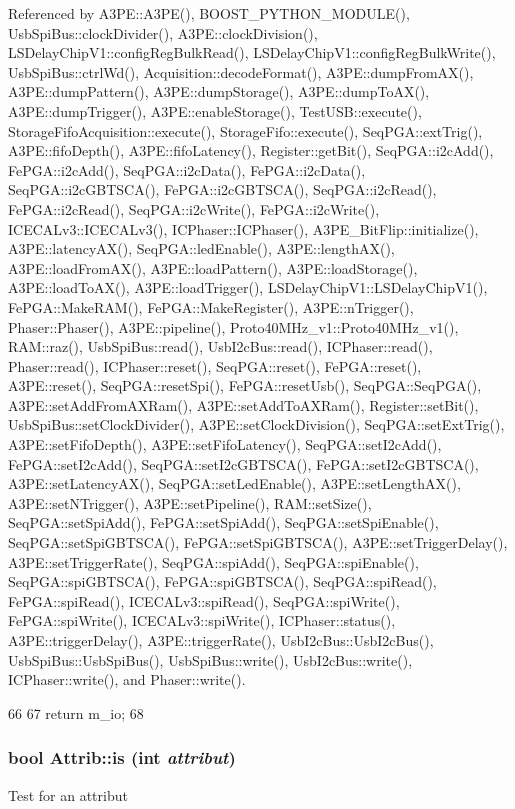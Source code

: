 Referenced by A3PE::A3PE(), BOOST\_\-PYTHON\_\-MODULE(), UsbSpiBus::clockDivider(), A3PE::clockDivision(), LSDelayChipV1::configRegBulkRead(), LSDelayChipV1::configRegBulkWrite(), UsbSpiBus::ctrlWd(), Acquisition::decodeFormat(), A3PE::dumpFromAX(), A3PE::dumpPattern(), A3PE::dumpStorage(), A3PE::dumpToAX(), A3PE::dumpTrigger(), A3PE::enableStorage(), TestUSB::execute(), StorageFifoAcquisition::execute(), StorageFifo::execute(), SeqPGA::extTrig(), A3PE::fifoDepth(), A3PE::fifoLatency(), Register::getBit(), SeqPGA::i2cAdd(), FePGA::i2cAdd(), SeqPGA::i2cData(), FePGA::i2cData(), SeqPGA::i2cGBTSCA(), FePGA::i2cGBTSCA(), SeqPGA::i2cRead(), FePGA::i2cRead(), SeqPGA::i2cWrite(), FePGA::i2cWrite(), ICECALv3::ICECALv3(), ICPhaser::ICPhaser(), A3PE\_\-BitFlip::initialize(), A3PE::latencyAX(), SeqPGA::ledEnable(), A3PE::lengthAX(), A3PE::loadFromAX(), A3PE::loadPattern(), A3PE::loadStorage(), A3PE::loadToAX(), A3PE::loadTrigger(), LSDelayChipV1::LSDelayChipV1(), FePGA::MakeRAM(), FePGA::MakeRegister(), A3PE::nTrigger(), Phaser::Phaser(), A3PE::pipeline(), Proto40MHz\_\-v1::Proto40MHz\_\-v1(), RAM::raz(), UsbSpiBus::read(), UsbI2cBus::read(), ICPhaser::read(), Phaser::read(), ICPhaser::reset(), SeqPGA::reset(), FePGA::reset(), A3PE::reset(), SeqPGA::resetSpi(), FePGA::resetUsb(), SeqPGA::SeqPGA(), A3PE::setAddFromAXRam(), A3PE::setAddToAXRam(), Register::setBit(), UsbSpiBus::setClockDivider(), A3PE::setClockDivision(), SeqPGA::setExtTrig(), A3PE::setFifoDepth(), A3PE::setFifoLatency(), SeqPGA::setI2cAdd(), FePGA::setI2cAdd(), SeqPGA::setI2cGBTSCA(), FePGA::setI2cGBTSCA(), A3PE::setLatencyAX(), SeqPGA::setLedEnable(), A3PE::setLengthAX(), A3PE::setNTrigger(), A3PE::setPipeline(), RAM::setSize(), SeqPGA::setSpiAdd(), FePGA::setSpiAdd(), SeqPGA::setSpiEnable(), SeqPGA::setSpiGBTSCA(), FePGA::setSpiGBTSCA(), A3PE::setTriggerDelay(), A3PE::setTriggerRate(), SeqPGA::spiAdd(), SeqPGA::spiEnable(), SeqPGA::spiGBTSCA(), FePGA::spiGBTSCA(), SeqPGA::spiRead(), FePGA::spiRead(), ICECALv3::spiRead(), SeqPGA::spiWrite(), FePGA::spiWrite(), ICECALv3::spiWrite(), ICPhaser::status(), A3PE::triggerDelay(), A3PE::triggerRate(), UsbI2cBus::UsbI2cBus(), UsbSpiBus::UsbSpiBus(), UsbSpiBus::write(), UsbI2cBus::write(), ICPhaser::write(), and Phaser::write().


\begin{DoxyCode}
66               {
67     return m_io;
68   }
\end{DoxyCode}
\hypertarget{classAttrib_a704f26af560909ad22065083bb7d4c34}{
\subsubsection[{is}]{\setlength{\rightskip}{0pt plus 5cm}bool Attrib::is (int {\em attribut})}}
\label{classAttrib_a704f26af560909ad22065083bb7d4c34}
Test for an attribut 


